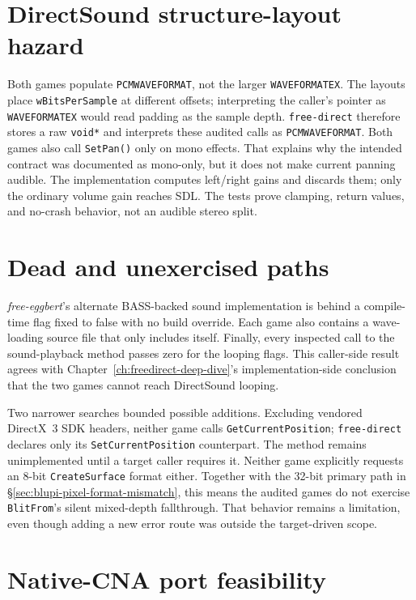 \section{DirectSound structure-layout hazard}

Both games populate \texttt{PCMWAVEFORMAT}, not the larger \texttt{WAVEFORMATEX}. The layouts
place \texttt{wBitsPerSample} at different offsets; interpreting the caller's pointer as
\texttt{WAVEFORMATEX} would read padding as the sample depth. \texttt{free-direct} therefore
stores a raw \texttt{void*} and interprets these audited calls as \texttt{PCMWAVEFORMAT}.
Both games also call \texttt{SetPan()} only on mono effects. That explains why the intended
contract was documented as mono-only, but it does not
make current panning audible. The implementation computes left/right gains and discards them;
only the ordinary volume gain reaches SDL. The tests prove clamping, return values, and no-crash
behavior, not an audible stereo split.

\section{Dead and unexercised paths}

\emph{free-eggbert}'s alternate BASS-backed sound implementation is behind a compile-time flag
fixed to false with no build override. Each game also contains a wave-loading source file that
only includes itself. Finally, every inspected call to the sound-playback method passes zero for
the looping flags. This caller-side result agrees with Chapter~\ref{ch:freedirect-deep-dive}'s
implementation-side conclusion that the two games cannot reach DirectSound looping.

Two narrower searches bounded possible additions. Excluding vendored DirectX~3 SDK headers,
neither game calls \texttt{GetCurrentPosition}; \texttt{free-direct} declares only its
\texttt{SetCurrentPosition} counterpart. The method remains unimplemented until a target caller
requires it. Neither game explicitly requests an 8-bit \texttt{CreateSurface} format either.
Together with the 32-bit primary path in \S\ref{sec:blupi-pixel-format-mismatch}, this means the
audited games do not exercise \texttt{BlitFrom}'s silent mixed-depth fallthrough. That behavior
remains a limitation, even though adding a new error route was outside the target-driven scope.

\section{Native-CNA port feasibility}

